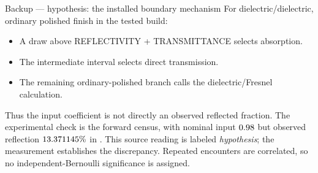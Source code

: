 \begin{frame}{Backup --- hypothesis: the installed boundary mechanism}
For dielectric/dielectric, ordinary polished finish in the tested build:
\begin{itemize}
\item A draw above REFLECTIVITY + TRANSMITTANCE selects absorption.
\item The intermediate interval selects direct transmission.
\item The remaining ordinary-polished branch calls the dielectric/Fresnel calculation.
\end{itemize}
Thus the input coefficient is not directly an observed reflected fraction. The experimental check is the forward census, with nominal input $0.98$ but observed reflection $13.371145\%$ in \IdROne.
\vspace{\Gap}
This source reading is labeled \emph{hypothesis}; the measurement establishes the discrepancy. Repeated encounters are correlated, so no independent-Bernoulli significance is assigned.
\end{frame}
